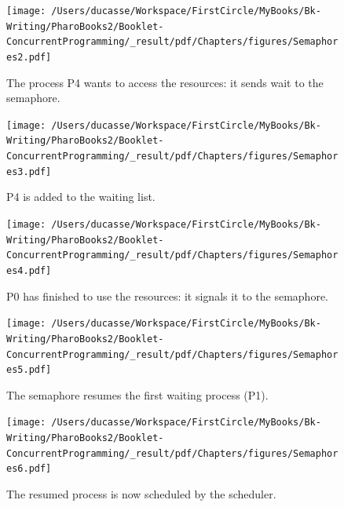 \documentclass[10pt,twoside,english]{_support/latex/sbabook/sbabook}
\begin{document}
\begin{figure}

\begin{center}
\texttt{[image: /Users/ducasse/Workspace/FirstCircle/MyBooks/Bk-Writing/PharoBooks2/Booklet-ConcurrentProgramming/\_result/pdf/Chapters/figures/Semaphores2.pdf]}\caption{The process P4 wants to access the resources: it sends wait to the semaphore.\label{Sema2}}\end{center}
\end{figure}



\begin{figure}

\begin{center}
\texttt{[image: /Users/ducasse/Workspace/FirstCircle/MyBooks/Bk-Writing/PharoBooks2/Booklet-ConcurrentProgramming/\_result/pdf/Chapters/figures/Semaphores3.pdf]}\caption{P4 is added to the waiting list.\label{Sema3}}\end{center}
\end{figure}



\begin{figure}

\begin{center}
\texttt{[image: /Users/ducasse/Workspace/FirstCircle/MyBooks/Bk-Writing/PharoBooks2/Booklet-ConcurrentProgramming/\_result/pdf/Chapters/figures/Semaphores4.pdf]}\caption{P0 has finished to use the resources: it signals it to the semaphore.\label{Sema4}}\end{center}
\end{figure}



\begin{figure}

\begin{center}
\texttt{[image: /Users/ducasse/Workspace/FirstCircle/MyBooks/Bk-Writing/PharoBooks2/Booklet-ConcurrentProgramming/\_result/pdf/Chapters/figures/Semaphores5.pdf]}\caption{The semaphore resumes the first waiting process (P1).\label{Sema5}}\end{center}
\end{figure}



\begin{figure}

\begin{center}
\texttt{[image: /Users/ducasse/Workspace/FirstCircle/MyBooks/Bk-Writing/PharoBooks2/Booklet-ConcurrentProgramming/\_result/pdf/Chapters/figures/Semaphores6.pdf]}\caption{The resumed process is now scheduled by the scheduler.\label{Sema6}}\end{center}
\end{figure}
\end{document}
